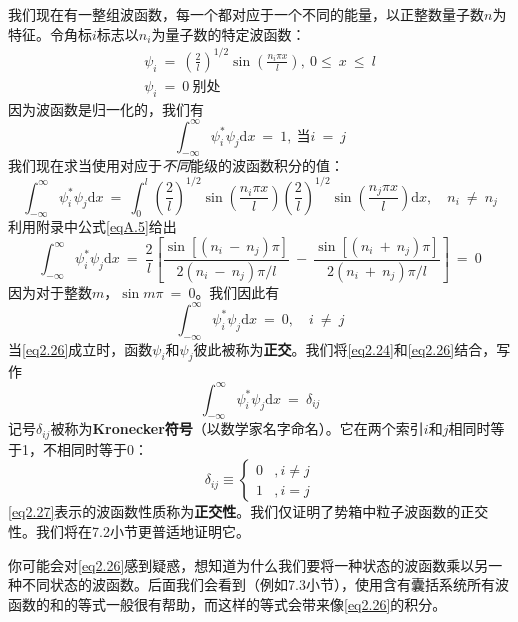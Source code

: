 \documentclass[12pt,a4paper,openany]{ctexbook}
\begin{document}
\begin{flushleft}
我们现在有一整组波函数，每一个都对应于一个不同的能量，以正整数量子数$n$为特征。令角标$i$标志以$n_i$为量子数的特定波函数：
\begin{gather*}
    \psi_i\ =\ (\frac{2}{l})^{1/2}\sin(\frac{n_i\pi x}{l}),\ 0 \leq\ x\ \leq\ l \\
    \psi_i\ =\ 0\ \text{别处}
\end{gather*}
因为波函数是归一化的，我们有
\begin{equation}
    \int_{-\infty}^{\infty}\psi_i^*\psi_j\mathrm{d}x\ =\ 1,\ \text{当}i\ =\ j 
    \label{eq2.24}
\end{equation}
我们现在求当使用对应于\textit{不同}能级的波函数积分的值：
\begin{equation*}
    \int_{-\infty}^{\infty}\psi_i^*\psi_j\mathrm{d}x\ =\ \int_0^l(\frac{2}{l})^{1/2}\sin(\frac{n_i\pi x}{l})(\frac{2}{l})^{1/2}\sin(\frac{n_j\pi x}{l})\mathrm{d}x,\quad n_i\ \neq\ n_j
\end{equation*}
利用附录中公式\eqref{eqA.5}给出
\begin{equation}
    \int_{-\infty}^{\infty}\psi_i^*\psi_j\mathrm{d}x\ =\ \frac{2}{l}[\frac{\sin[(n_i\ -\ n_j)\pi]}{2(n_i\ -\ n_j)\pi/l}\ -\ \frac{\sin[(n_i\ +\ n_j)\pi]}{2(n_i\ +\ n_j)\pi/l}]\ =\ 0
    \label{eq2.25}
\end{equation}
因为对于整数$m$，$\sin m\pi\ =\ 0$。我们因此有
\begin{equation}
    \int_{-\infty}^{\infty}\psi_i^*\psi_j\mathrm{d}x\ =\ 0,\quad i\ \neq\ j
    \label{eq2.26}
\end{equation}
当\eqref{eq2.26}成立时，函数$\psi_i$和$\psi_j$彼此被称为\textbf{正交}。我们将\eqref{eq2.24}和\eqref{eq2.26}结合，写作
\begin{equation}
    \int_{-\infty}^{\infty}\psi_i^*\psi_j\mathrm{d}x\ =\ \delta_{ij}
    \label{eq2.27}
\end{equation}
记号$\delta_{ij}$被称为\textbf{Kronecker符号}（以数学家名字命名）。它在两个索引$i$和$j$相同时等于1，不相同时等于0：
\begin{equation}
    \boxed{\delta_{ij} \equiv
    \begin{cases} 
    0 & ,i \neq j \\
    1 & ,i = j 
    \end{cases}}
\end{equation}
\eqref{eq2.27}表示的波函数性质称为\textbf{正交性}。我们仅证明了势箱中粒子波函数的正交性。我们将在7.2小节更普适地证明它。

你可能会对\eqref{eq2.26}感到疑惑，想知道为什么我们要将一种状态的波函数乘以另一种不同状态的波函数。后面我们会看到（例如7.3小节），使用含有囊括系统所有波函数的和的等式一般很有帮助，而这样的等式会带来像\eqref{eq2.26}的积分。


\end{flushleft}
\end{document}
